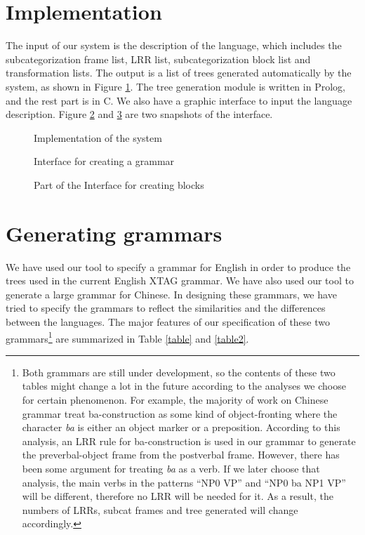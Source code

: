 \section{Implementation}

The input of our system is the description of the language, which includes 
the subcategorization frame list, LRR list, subcategorization block
list and transformation lists. The output  is a list of
trees generated automatically by the system, as shown in Figure
\ref{impl}. The tree generation module is written in Prolog, and 
the rest part is in C. We also have a graphic interface to input 
the language description. Figure \ref{interface-firstlevel} and
\ref{interface-block} are two snapshots of the interface.

\begin{figure}[htb]
\centerline{}
\caption{Implementation of the system}
\label{impl}
\end{figure}


\begin{figure}[htb]
\centerline{}
\caption{Interface for creating a grammar}
\label{interface-firstlevel}
\end{figure}


\begin{figure}[htb]
\centerline{}
\vspace{0.4in}
\caption{Part of the Interface for creating blocks}
\label{interface-block}
\end{figure}


\section{Generating grammars}

We have used our tool to specify a grammar for English in order to produce
the trees used in the current English XTAG grammar.
We have also used our tool
to generate a large grammar for Chinese.
In designing these
grammars, we have tried to specify the grammars to reflect the similarities and
the differences between the languages. The major features of our specification
of these two grammars\footnote{Both grammars are still under development,
so the contents of these two tables might change a lot in the future
according to
the analyses we choose for certain phenomenon. For example,
the majority of work on Chinese grammar treat ba-construction as some kind
of object-fronting where the character 
{\it ba} is either an object marker or a preposition. According to this
analysis, an LRR rule for ba-construction is used in our grammar to generate
the preverbal-object frame from the postverbal frame. However, there has
been some argument for treating {\it ba} as a verb. If we later choose
that analysis, the main verbs in the patterns ``NP0 VP'' and ``NP0 ba NP1 VP''
will be different, therefore no LRR will be needed for it. As a result, the
numbers of LRRs, subcat frames and tree generated will change accordingly.}
 are summarized in Table \ref{table} and \ref{table2}.

